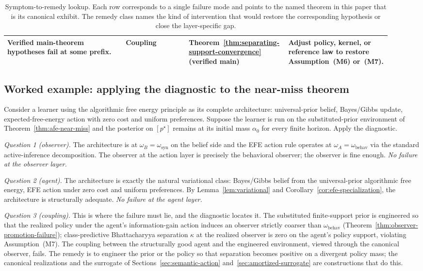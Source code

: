 \documentclass[11pt]{article}
\theoremstyle{definition}
\theoremstyle{remark}
\begin{document}
\begin{table}[h]
\begin{tabular}{p{0.30\linewidth}p{0.16\linewidth}p{0.20\linewidth}p{0.26\linewidth}}
Verified main-theorem hypotheses fail at some prefix. & Coupling & Theorem~\ref{thm:separating-support-convergence} (verified main) & Adjust policy, kernel, or reference law to restore Assumption~\textup{(M6)} or~\textup{(M7)}. \\
\bottomrule
\end{tabular}
\caption{Symptom-to-remedy lookup. Each row corresponds to a single failure mode and points to the named theorem in this paper that is its canonical exhibit. The remedy class names the kind of intervention that would restore the corresponding hypothesis or close the layer-specific gap.}
\label{tab:diagnostic}
\end{table}

\subsection{Worked example: applying the diagnostic to the near-miss theorem}
\label{app:diagnostic-example}

Consider a learner using the algorithmic free energy principle as its complete architecture: universal-prior belief, Bayes/Gibbs update, expected-free-energy action with zero cost and uniform preferences. Suppose the learner is run on the substituted-prior environment of Theorem~\ref{thm:afe-near-miss} and the posterior on $[p^\star]$ remains at its initial mass $\alpha_0$ for every finite horizon. Apply the diagnostic.

\emph{Question 1 (observer).} The architecture is at $\omega_B=\omega_{\mathrm{syn}}$ on the belief side and the EFE action rule operates at $\omega_A=\omega_{\mathrm{behav}}$ via the standard active-inference decomposition. The observer at the action layer is precisely the behavioral observer; the observer is fine enough. \emph{No failure at the observer layer.}

\emph{Question 2 (agent).} The architecture is exactly the natural variational class: Bayes/Gibbs belief from the universal-prior algorithmic free energy, EFE action under zero cost and uniform preferences. By Lemma~\ref{lem:variational} and Corollary~\ref{cor:efe-specialization}, the architecture is structurally adequate. \emph{No failure at the agent layer.}

\emph{Question 3 (coupling).} This is where the failure must lie, and the diagnostic locates it. The substituted finite-support prior is engineered so that the realized policy under the agent's information-gain action induces an observer strictly coarser than $\omega_{\mathrm{behav}}$ (Theorem~\ref{thm:observer-promotion-failure}); class-predictive Bhattacharyya separation $\kappa$ at the realized observer is zero on the agent's policy support, violating Assumption~\textup{(M7)}. The coupling between the structurally good agent and the engineered environment, viewed through the canonical observer, fails. The remedy is to engineer the prior or the policy so that separation becomes positive on a divergent policy mass; the canonical realizations and the surrogate of Sections~\ref{sec:semantic-action} and~\ref{sec:amortized-surrogate} are constructions that do this.
\end{document}
